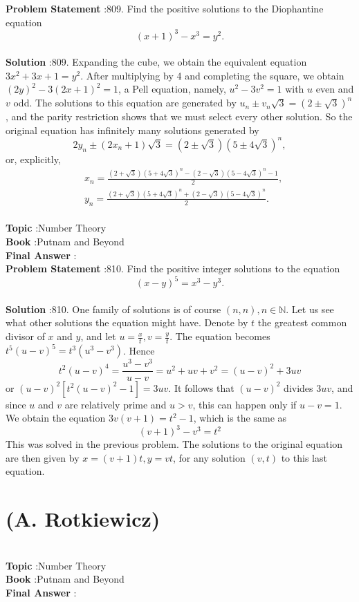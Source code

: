 \documentclass[10pt]{article}
\begin{document}
\textbf{Problem Statement} :809. Find the positive solutions to the Diophantine equation$$ (x+1)^{3}-x^{3}=y^{2} . $$\\
\textbf{Solution} :809. Expanding the cube, we obtain the equivalent equation $3 x^{2}+3 x+1=y^{2}$. After multiplying by 4 and completing the square, we obtain $(2 y)^{2}-3(2 x+1)^{2}=1$, a Pell equation, namely, $u^{2}-3 v^{2}=1$ with $u$ even and $v$ odd. The solutions to this equation are generated by $u_{n} \pm v_{n} \sqrt{3}=(2 \pm \sqrt{3})^{n}$, and the parity restriction shows that we must select every other solution. So the original equation has infinitely many solutions generated by$$ 2 y_{n} \pm\left(2 x_{n}+1\right) \sqrt{3}=(2 \pm \sqrt{3})(5 \pm 4 \sqrt{3})^{n}, $$or, explicitly,$$ \begin{aligned} &x_{n}=\frac{(2+\sqrt{3})(5+4 \sqrt{3})^{n}-(2-\sqrt{3})(5-4 \sqrt{3})^{n}-1}{2}, \\ &y_{n}=\frac{(2+\sqrt{3})(5+4 \sqrt{3})^{n}+(2-\sqrt{3})(5-4 \sqrt{3})^{n}}{2} . \end{aligned} $$\\
\textbf{Topic} :Number Theory\\
\textbf{Book} :Putnam and Beyond\\
\textbf{Final Answer} :\\


\textbf{Problem Statement} :810. Find the positive integer solutions to the equation$$ (x-y)^{5}=x^{3}-y^{3} . $$\\
\textbf{Solution} :810. One family of solutions is of course $(n, n), n \in \mathbb{N}$. Let us see what other solutions the equation might have. Denote by $t$ the greatest common divisor of $x$ and $y$, and let $u=\frac{x}{t}, v=\frac{y}{t}$. The equation becomes $t^{5}(u-v)^{5}=t^{3}\left(u^{3}-v^{3}\right)$. Hence$$ t^{2}(u-v)^{4}=\frac{u^{3}-v^{3}}{u-v}=u^{2}+u v+v^{2}=(u-v)^{2}+3 u v $$or $(u-v)^{2}\left[t^{2}(u-v)^{2}-1\right]=3 u v$. It follows that $(u-v)^{2}$ divides $3 u v$, and since $u$ and $v$ are relatively prime and $u>v$, this can happen only if $u-v=1$. We obtain the equation $3 v(v+1)=t^{2}-1$, which is the same as$$ (v+1)^{3}-v^{3}=t^{2} $$This was solved in the previous problem. The solutions to the original equation are then given by $x=(v+1) t, y=v t$, for any solution $(v, t)$ to this last equation.\section{(A. Rotkiewicz)}\\
\textbf{Topic} :Number Theory\\
\textbf{Book} :Putnam and Beyond\\
\textbf{Final Answer} :\\
\end{document}
